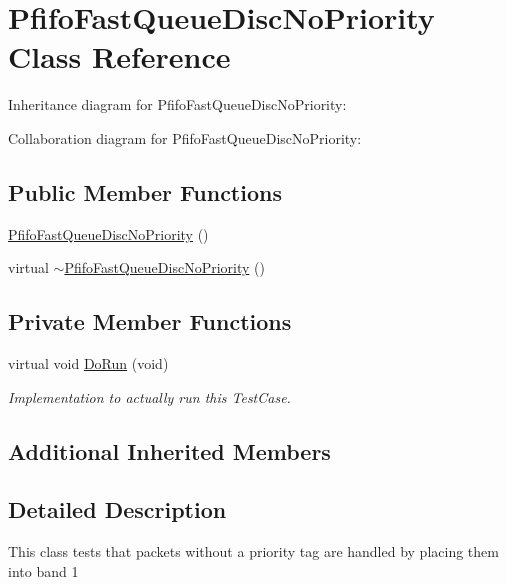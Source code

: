 \hypertarget{classPfifoFastQueueDiscNoPriority}{}\section{Pfifo\+Fast\+Queue\+Disc\+No\+Priority Class Reference}
\label{classPfifoFastQueueDiscNoPriority}


Inheritance diagram for Pfifo\+Fast\+Queue\+Disc\+No\+Priority\+:


Collaboration diagram for Pfifo\+Fast\+Queue\+Disc\+No\+Priority\+:
\subsection*{Public Member Functions}
\begin{DoxyCompactItemize}
\item 
\hyperlink{classPfifoFastQueueDiscNoPriority_a1517484eb44fb78dbdff5c49fb2b56da}{Pfifo\+Fast\+Queue\+Disc\+No\+Priority} ()
\item 
virtual \hyperlink{classPfifoFastQueueDiscNoPriority_a2ff51fd8e0db6767b414003e5f6cb0e1}{$\sim$\+Pfifo\+Fast\+Queue\+Disc\+No\+Priority} ()
\end{DoxyCompactItemize}
\subsection*{Private Member Functions}
\begin{DoxyCompactItemize}
\item 
virtual void \hyperlink{classPfifoFastQueueDiscNoPriority_a0e5f55c325fa3c1d91a1ed253ff2f3a5}{Do\+Run} (void)
\begin{DoxyCompactList}\small\item\em Implementation to actually run this Test\+Case. \end{DoxyCompactList}\end{DoxyCompactItemize}
\subsection*{Additional Inherited Members}


\subsection{Detailed Description}
This class tests that packets without a priority tag are handled by placing them into band 1 

